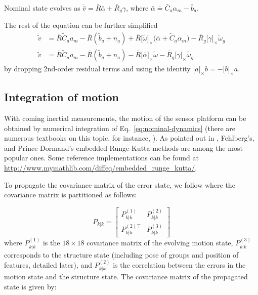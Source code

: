 \documentclass[letter,10pt]{article}
\newcommand{\asym}[1]{{\lbrack #1\rbrack}_\times{}}
\begin{document}
Nominal state evolves as $\dot{\bar v} = \bar R\bar\alpha + \bar R_g \gamma$, where $\bar\alpha\doteq\bar C_a \alpha_m - \bar b_a$.

The rest of the equation can be further simplified
\begin{align}
\dot{\tilde v} &= \bar R \tilde C_a a_m - \bar R(\tilde b_a + n_a) + \bar R\asym{\tilde\omega}\big(\bar\alpha  + \tilde C_a \alpha_m\big) - \bar R_g\asym{\gamma}\tilde\omega_g \\
\dot{\tilde v} &= \bar R \tilde C_a a_m - \bar R(\tilde b_a + n_a) - \bar R\asym{\bar\alpha}\tilde\omega - \bar R_g \asym{\gamma}\tilde\omega_g
\end{align}
by dropping 2nd-order residual terms and using the identity $\asym{a}b=-\asym{b}a$.




\subsection{Integration of motion}

With coming inertial measurements, the motion of the sensor platform can be obtained by numerical integration of Eq.~\eqref{eq:nominal-dynamics} (there are numerous textbooks on this topic, for instance, \cite{ascher1998computer}). As pointed out in \cite{ascher1998computer}, Fehlberg's, and Prince-Dormand's embedded Runge-Kutta methods are among the most popular ones. Some reference implementations can be found at \url{http://www.mymathlib.com/diffeq/embedded_runge_kutta/}.

To propagate the covariance matrix of the error state, we follow \cite{mourikis2007multi} where the covariance matrix is partitioned as follows:

\begin{equation}
    P_{k|k} = 
    \begin{bmatrix}
        P_{k|k}^{(1)} & P_{k|k}^{(2)} \\
        P_{k|k}^{(2)\top} & P_{k|k}^{(3)}
    \end{bmatrix}
    \label{eq:covariance-partition}
\end{equation}
where $P_{k|k}^{(1)}$ is the $18\times 18$ covariance matrix of the evolving motion state, $P_{k|k}^{(3)}$ corresponds to the structure state (including pose of groups and position of features, detailed later), and $P_{k|k}^{(2)}$  is the correlation between the errors in the motion state and the structure state. The covariance matrix of the propagated state is given by:
\end{document}
